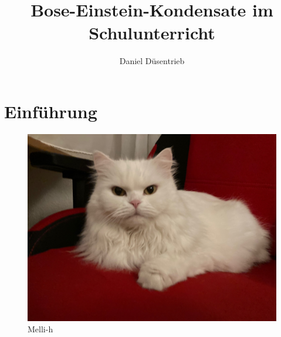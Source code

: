 \documentclass[12pt,ngerman,twocolumn]{article}
\title{Bose-Einstein-Kondensate im Schulunterricht}
\author{Daniel Düsentrieb}
\begin{document}
\maketitle

\begin{abstract}
\blindtext[2]
\end{abstract}

\section{Einführung}

\blindtext[2]

\begin{figure}[H]\centering
\includegraphics[width=\columnwidth]{Katze}
\caption{Melli-h}
\end{figure}

\blindtext[2]


\blindtext[2]


\blindtext[2]
\end{document}
